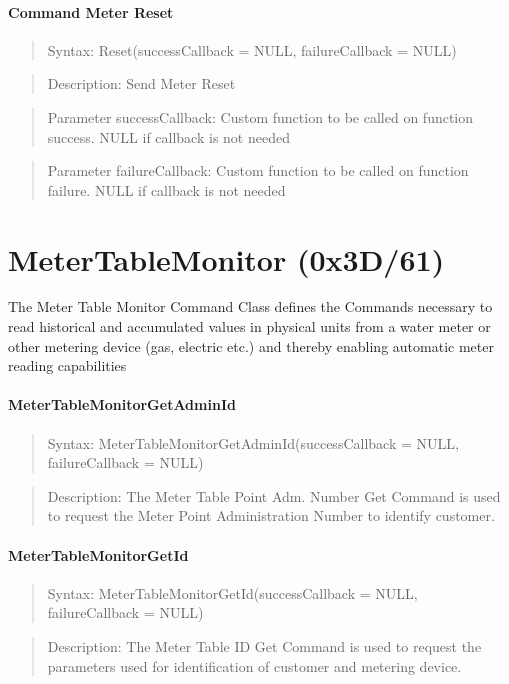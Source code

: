 \paragraph {Command Meter Reset}
\begin{quote} Syntax: Reset(successCallback = NULL, failureCallback = NULL)\end{quote}
\begin{quote} Description: Send Meter Reset\end{quote}
\begin{quote} Parameter successCallback: Custom function to be called on function success. NULL if callback is not needed\end{quote}
\begin{quote} Parameter failureCallback: Custom function to be called on function failure. NULL if callback is not needed\end{quote}
  
\section{MeterTableMonitor (0x3D/61)}	

The Meter Table Monitor Command Class defines the Commands necessary to read historical 
and accumulated values in physical units from a water meter or other metering device 
(gas, electric etc.) and thereby enabling automatic meter reading capabilities

\paragraph {MeterTableMonitorGetAdminId}
\begin{quote} Syntax: MeterTableMonitorGetAdminId(successCallback = NULL, failureCallback = NULL)\end{quote}
\begin{quote} Description: The Meter Table Point Adm. Number Get Command is used to request 
the Meter Point Administration Number to identify customer. \end{quote}

\paragraph {MeterTableMonitorGetId}
\begin{quote} Syntax: MeterTableMonitorGetId(successCallback = NULL, failureCallback = NULL)\end{quote} 
\begin{quote} Description: The Meter Table ID Get Command is used to request the parameters 
used for identification of customer and metering device. \end{quote}

